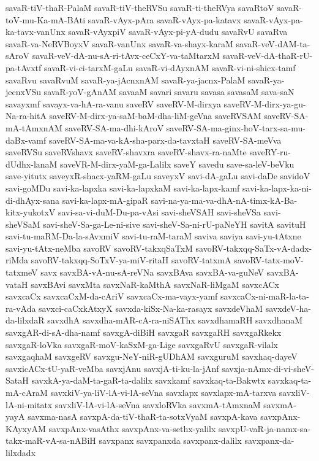 {savaR-tiV-thaR-PalaM
savaR-tiV-theRVSu
savaR-ti-theRVya
savaRtoV
savaR-toV-mu-Ka-mA-BAti
savaR-vAyx-pAra
savaR-vAyx-pa-katavx
savaR-vAyx-pa-ka-tavx-vanUnx
savaR-vAyxpiV
savaR-vAyx-pi-yA-dudu
savaRvU
savaRva
savaR-va-NeRVBoyxV
savaR-vanUnx
savaR-va-shayx-karaM
savaR-veV-dAM-ta-sAroV
savaR-veV-dA-nu-sA-ri-tAvx-ceCxY-va-taMtarxM
savaR-veV-dA-thaR-rU-pa-tAvxtf
savaR-vi-ci-tarxM-gaLu
savaR-vi-dAyxnAM
savaR-vi-ni-shicx-tamf
savaRvu
savaRvuM
savaR-ya-jAcnxnAM
savaR-ya-jacnx-PalaM
savaR-ya-jecnxVSu
savaR-yoV-gAnAM
savaaM
savari
savaru
savasa
savasaM
sava-saN
savayxmf
savayx-va-hA-ra-vanu
saveRV
saveRV-M-dirxya
saveRV-M-dirx-ya-gu-Na-ra-hitA
saveRV-M-dirx-ya-saM-baM-dha-liM-geVna
saveRVSAM
saveRV-SA-mA-tAmxnAM
saveRV-SA-ma-dhi-kAroV
saveRV-SA-ma-ginx-hoV-tarx-sa-mu-daBx-vamf
saveRV-SA-ma-va-kA-sha-parx-da-tavxtaH
saveRV-SA-meVva
saveRVSu
saveRVshavx
saveRV-shavxra
saveRV-shavx-ra-naMte
saveRY-ru-dUdhx-lanaM
saveVR-M-dirx-yaM-ga-Lalilx
saveY
savedu
save-sa-leV-beVku
save-yitutx
saveyxR-shacx-yaRM-gaLu
saveyxV
savi-dA-gaLu
savi-daDe
savidoV
savi-goMDu
savi-ka-lapxka
savi-ka-lapxkaM
savi-ka-lapx-kamf
savi-ka-lapx-ka-ni-di-dhAyx-sana
savi-ka-lapx-mA-gipaR
savi-na-ya-ma-va-dhA-nA-timx-kA-Ba-kitx-yukotxV
savi-sa-vi-duM-Du-pa-vAsi
savi-sheVSAH
savi-sheVSa
savi-sheVSaM
savi-sheV-Sa-ga-Le-ni-sive
savi-sheV-Sa-ni-rU-paNeYH
savitA
savituH
savi-tu-maRM-Da-la-sAvxmiV
savi-tu-raM-taraM
saviva
saviya
savi-yu-tAtxne
savi-yu-tAtx-neMba
savoRV
savoRV-takxqSaTxM
savoRV-takxqq-SaTx-vA-dadx-riMda
savoRV-takxqq-SoTxV-ya-miV-ritaH
savoRV-tatxmA
savoRV-tatx-moV-tatxmeV
savx
savxBA-vA-nu-sA-reVNa
savxBAva
savxBA-va-guNeV
savxBA-vataH
savxBAvi
savxMta
savxNaR-kaMthA
savxNaR-liMgaM
savxcACx
savxcaCx
savxcaCxM-da-cAriV
savxcaCx-ma-vayx-yamf
savxcaCx-ni-maR-la-ta-ra-vAda
savxci-caCxkAtxyX
savxda-kiSx-Na-ka-rasayx
savxdeVhaM
savxdeV-ha-da-lilxdaR
savxdhA
savxdha-mAR-cA-ra-niSAThx
savxdhamaRH
savxdhanaM
savxgAR-di-sA-dha-namf
savxgA-diBiH
savxgaR
savxgaRH
savxgaRkekx
savxgaR-loVka
savxgaR-moV-kaSxM-ga-Lige
savxgaRvU
savxgaR-vilalx
savxgaqhaM
savxgeRV
savxgu-NeY-niR-gUDhAM
savxguruM
savxhaq-dayeV
savxicACx-tU-yaR-veMba
savxjAnu
savxjA-ti-ku-la-jAnf
savxja-nAmx-di-vi-sheV-SataH
savxkA-ya-daM-ta-gaR-ta-dalilx
savxkamf
savxkaq-ta-Bakwtx
savxkaq-ta-mA-cAraM
savxkiV-ya-liV-lA-vi-lA-seVna
savxlapx
savxlapx-mA-tarxva
savxliV-lA-ni-mitatx
savxliV-lA-vi-lA-seVna
savxloRVka
savxmA-tAmxnaM
savxmA-yayA
savxma-nasA
savxpA-da-tiV-thaR-ta-sotxVyaM
savxpA-kava
savxpAnx-KAyxyAM
savxpAnx-vasAthx
savxpAnx-va-sethx-yalilx
savxpU-vaR-ja-namx-sa-takx-maR-vA-sa-nABiH
savxpanx
savxpanxda
savxpanx-dalilx
savxpanx-da-lilxdadx
}
